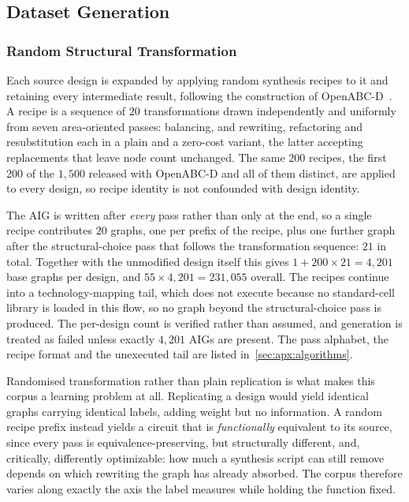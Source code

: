 
\subsection{Dataset Generation}
\label{sec:method:data:generation}

\subsubsection{Random Structural Transformation}
\label{sec:method:data:generation:transform}
Each source design is expanded by applying random synthesis recipes to it and retaining
every intermediate result, following the construction of
OpenABC-D~\citep{chowdhury2021openabc}. A recipe is a sequence of $20$ transformations drawn
independently and uniformly from seven area-oriented passes: balancing, and rewriting,
refactoring and resubstitution each in a plain and a zero-cost variant, the latter accepting
replacements that leave node count unchanged. The same $200$ recipes, the first $200$ of the
$1{,}500$ released with OpenABC-D and all of them distinct, are applied to every design, so
recipe identity is not confounded with design identity.

The AIG is written after \emph{every} pass rather than only at the end, so a single recipe
contributes $20$ graphs, one per prefix of the recipe, plus one further graph after the
structural-choice pass that follows the transformation sequence: $21$ in total. Together with
the unmodified design itself this gives $1 + 200 \times 21 = 4{,}201$ base graphs per design,
and $55 \times 4{,}201 = 231{,}055$ overall. The recipes continue into a technology-mapping
tail, which does not execute because no standard-cell library is loaded in this flow, so no
graph beyond the structural-choice pass is produced. The per-design count is verified rather
than assumed, and generation is treated as failed unless exactly $4{,}201$ AIGs are present.
The pass alphabet, the recipe format and the unexecuted tail are listed
in~\ref{sec:apx:algorithms}.

Randomised transformation rather than plain replication is what makes this corpus a learning
problem at all. Replicating a design would yield identical graphs carrying identical labels,
adding weight but no information. A random recipe prefix instead yields a circuit that is
\emph{functionally} equivalent to its source, since every pass is equivalence-preserving, but
structurally different, and, critically, differently optimizable: how much a synthesis script
can still remove depends on which rewriting the graph has already absorbed. The corpus
therefore varies along exactly the axis the label measures while holding the function fixed.

